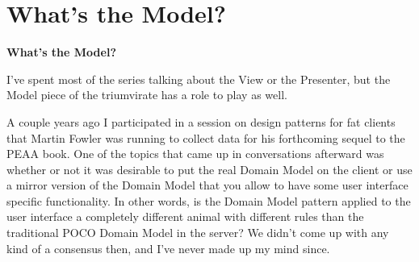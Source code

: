 \documentclass{article}
\begin{document}
{\section{ What's the Model? } 

\Large {\textbf{What's the Model? }}

I've spent most of the series talking about the View or the Presenter, but the Model piece of the triumvirate has a role to play as well. 

A couple years ago I participated in a session on design patterns for fat clients that Martin Fowler was running to collect data for his forthcoming sequel to the PEAA book.  One of the topics that came up in conversations afterward was whether or not it was desirable to put the real Domain Model on the client or use a mirror version of the Domain Model that you allow to have some user interface specific functionality.  In other words, is the Domain Model pattern applied to the user interface a completely different animal with different rules than the traditional POCO Domain Model in the server?  We didn't come up with any kind of a consensus then, and I've never made up my mind since. 

}
\end{document}
